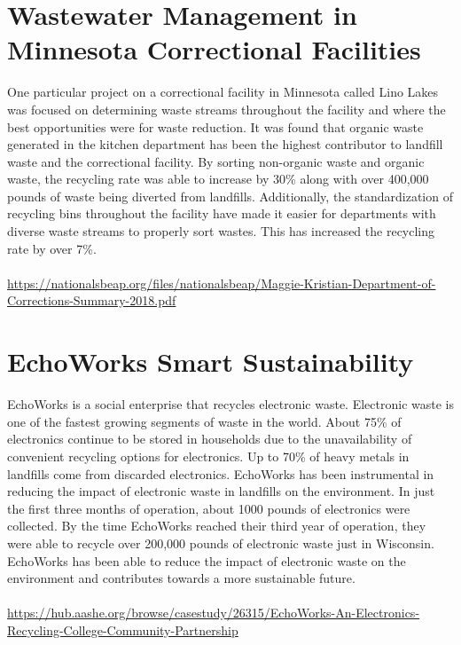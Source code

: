 \documentclass{article}
\begin{document}
\begin{spacing}{2.15}
    \section{Wastewater Management in Minnesota Correctional Facilities}
    \indent One particular project on a correctional facility in Minnesota called Lino Lakes was focused on determining waste streams throughout the facility and where the best opportunities were for waste reduction. It was found that organic waste generated in the kitchen department has been the highest contributor to landfill waste and the correctional facility. By sorting non-organic waste and organic waste, the recycling rate was able to increase by 30\% along with over 400,000 pounds of waste being diverted from landfills. Additionally, the standardization of recycling bins throughout the facility have made it easier for departments with diverse waste streams to properly sort wastes. This has increased the recycling rate by over 7\%. \\\\
    \url{https://nationalsbeap.org/files/nationalsbeap/Maggie-Kristian-Department-of-Corrections-Summary-2018.pdf}
    \newpage
    \section{EchoWorks Smart Sustainability}
    \indent EchoWorks is a social enterprise that recycles electronic waste. Electronic waste is one of the fastest growing segments of waste in the world. About 75\% of electronics continue to be stored in households due to the unavailability of convenient recycling options for electronics. Up to 70\% of heavy metals in landfills come from discarded electronics. EchoWorks has been instrumental in reducing the impact of electronic waste in landfills on the environment. In just the first three months of operation, about 1000 pounds of electronics were collected. By the time EchoWorks reached their third year of operation, they were able to recycle over 200,000 pounds of electronic waste just in Wisconsin. EchoWorks has been able to reduce the impact of electronic waste on the environment and contributes towards a more sustainable future. \\\\
    \url{https://hub.aashe.org/browse/casestudy/26315/EchoWorks-An-Electronics-Recycling-College-Community-Partnership}

\end{spacing}
\end{document}

